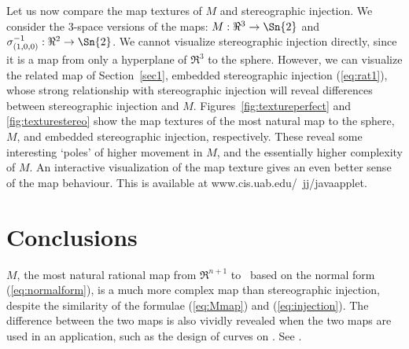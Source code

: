 %
%

Let us now compare the map textures of $M$ and stereographic injection.
We consider the 3-space versions of the maps:
$M: \Re^3 \rightarrow \Sn{2}$ and 
$\sigma^{-1}_{(1,0,0)}:\Re^2 \rightarrow \Sn{2}$.
We cannot visualize stereographic injection directly,
since it is a map from only a hyperplane of $\Re^3$ to the sphere.
However, we can visualize the related map of Section~\ref{sec1},
embedded stereographic injection (\ref{eq:rat1}),
whose strong relationship with stereographic injection
will reveal differences between stereographic injection and $M$.
Figures~\ref{fig:textureperfect} and \ref{fig:texturestereo} show the 
map textures of the most natural map to the sphere, $M$, and
embedded stereographic injection, respectively.
These reveal some interesting `poles' of higher movement in $M$,
and the essentially higher complexity of $M$.
An interactive visualization of the map texture gives an even better sense 
of the map behaviour.
This is available at www.cis.uab.edu/~jj/javaapplet.

\section{Conclusions} 

$M$, the most natural rational map from $\Re^{n+1}$ to \ 
based on the normal form (\ref{eq:normalform}),
is a much more complex map than stereographic injection,
despite the similarity of the formulae (\ref{eq:Mmap}) and (\ref{eq:injection}).
The difference between the two maps
is also vividly revealed when the two maps are used
in an application, such as the design of curves on .
See \cite{jj+jimbo98}.



